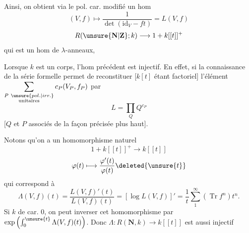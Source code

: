 Ainsi, on obtient via le pol. car. modifié un
hom
\[
(V,f)\longmapsto\frac1{\det(\mathrm{id}_V-ft)}=L(V,f)
\]
\[
R(\unsure{\mathbf N|\mathbf Z};k)\longrightarrow 1+k[[t]]^+
\]
qui est un hom de $\lambda$-anneaux,

Lorsque $k$ est un corps, l'hom
précédent est injectif. En effet, si
 la connaissance de la
série formelle permet de reconstituer 
[$k[t]$
étant factoriel] l'élément
$\displaystyle\sum_{\substack{P\ \unsure{pol.|irr.}\\\mathrm{unitaires}}}c_P(V_P,f_P)$
 par
\[
L=\prod_Q Q^{c_P}
\]
[$Q$ et $P$ associés de
la façon précisée plus haut].

Notons qu'on a un homomorphisme
naturel 
\[
1+k[[t]]^+\longrightarrow k[[t]]
\]
\[
\varphi(t)\longmapsto\frac{\varphi'(t)}{\varphi(t)}\deleted{\unsure{t}}
\]
qui correspond à
\[
\Lambda(V,f)(t)=\frac{L(V,f)'(t)}{L(V,f)(t)}
=[\log L(V,f)]'=\frac1t\sum_1^\infty(\operatorname{Tr}f^n)t^n.
\]
Si $k$ de car. $0$,  on peut inverser cet
homomorphisme par $\exp\left(\int_0^{\unsure{t}}\Lambda(V,f)(t)\right)$.
Donc 
$\Lambda:R(\mathbf N,k)\longrightarrow k[[t]]$ est aussi injectif 
